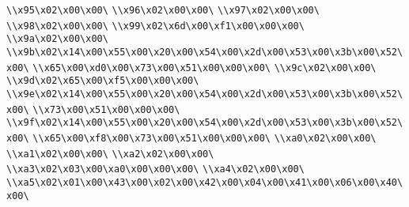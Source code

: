 \verb|\\x95\x02\x00\x00\|\newline
\verb|\\x96\x02\x00\x00\|\newline
\verb|\\x97\x02\x00\x00\|\newline
\verb|\\x98\x02\x00\x00\|\newline
\verb|\\x99\x02\x6d\x00\xf1\x00\x00\x00\|\newline
\verb|\\x9a\x02\x00\x00\|\newline
\verb|\\x9b\x02\x14\x00\x55\x00\x20\x00\x54\x00\x2d\x00\x53\x00\x3b\x00\x52\x00\|\newline
\verb|\\x65\x00\xd0\x00\x73\x00\x51\x00\x00\x00\|\newline
\verb|\\x9c\x02\x00\x00\|\newline
\verb|\\x9d\x02\x65\x00\xf5\x00\x00\x00\|\newline
\verb|\\x9e\x02\x14\x00\x55\x00\x20\x00\x54\x00\x2d\x00\x53\x00\x3b\x00\x52\x00\|\newline
\verb|\\x73\x00\x51\x00\x00\x00\|\newline
\verb|\\x9f\x02\x14\x00\x55\x00\x20\x00\x54\x00\x2d\x00\x53\x00\x3b\x00\x52\x00\|\newline
\verb|\\x65\x00\xf8\x00\x73\x00\x51\x00\x00\x00\|\newline
\verb|\\xa0\x02\x00\x00\|\newline
\verb|\\xa1\x02\x00\x00\|\newline
\verb|\\xa2\x02\x00\x00\|\newline
\verb|\\xa3\x02\x03\x00\xa0\x00\x00\x00\|\newline
\verb|\\xa4\x02\x00\x00\|\newline
\verb|\\xa5\x02\x01\x00\x43\x00\x02\x00\x42\x00\x04\x00\x41\x00\x06\x00\x40\x00\|\newline
